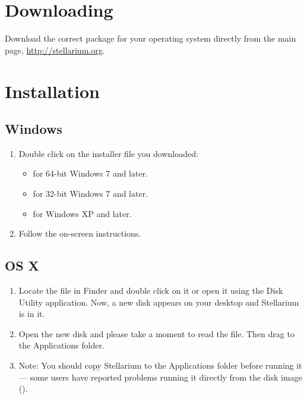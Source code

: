 \section{Downloading}
\label{sec:GettingStarted:Downloading}

Download the correct package for your operating system directly from the main page, \newline \url{http://stellarium.org}.

\section{Installation}
\label{sec:GettingStarted:Installation}

\subsection{Windows}

\begin{enumerate}
\item Double click on the installer file you downloaded:
\begin{itemize}
\item {} for 64-bit Windows 7 and later.
\item {} for 32-bit Windows 7 and later.
\item {} for Windows XP and later.
\end{itemize}
\item Follow the on-screen instructions.
\end{enumerate}

\subsection{OS X}

\begin{enumerate}
\item
  Locate the  file in
  Finder and double click on it or open it using the Disk Utility
  application. Now, a new disk appears on your desktop and Stellarium is
  in it.
\item
  Open the new disk and please take a moment to read the  file.
  Then drag  to the Applications folder.
\item
  Note: You should copy Stellarium to the Applications folder before
  running it --- some users have reported problems running it directly
  from the disk image ().
\end{enumerate}

